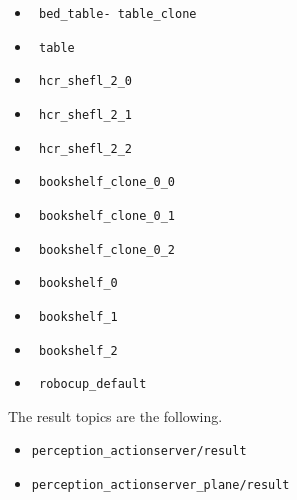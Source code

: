 \documentclass[main.tex]{subfiles}
\begin{document}
\begin{itemize}
\item \begin{verbatim} bed_table- table_clone \end{verbatim} 
\item \begin{verbatim} table \end{verbatim} 
\item \begin{verbatim} hcr_shefl_2_0 \end{verbatim} 
\item \begin{verbatim} hcr_shefl_2_1 \end{verbatim}
\item \begin{verbatim} hcr_shefl_2_2 \end{verbatim}
\item \begin{verbatim} bookshelf_clone_0_0 \end{verbatim} 
\item \begin{verbatim} bookshelf_clone_0_1 \end{verbatim} 
\item \begin{verbatim} bookshelf_clone_0_2 \end{verbatim} 
\item \begin{verbatim} bookshelf_0 \end{verbatim} 
\item \begin{verbatim} bookshelf_1 \end{verbatim} 
\item \begin{verbatim} bookshelf_2 \end{verbatim} 
\item \begin{verbatim} robocup_default \end{verbatim} 
\end{itemize}

The result topics are the following.
\begin{itemize}
\item \begin{verbatim}
perception_actionserver/result
\end{verbatim}
\item \begin{verbatim}
perception_actionserver_plane/result
\end{verbatim}
\end{itemize}
\end{document}
